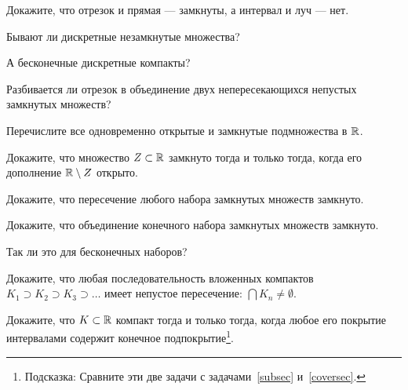 \documentclass[a4paper, 12pt, num=27]{listok}
\begin{document}
\begin{problem}
	Докажите, что отрезок и прямая --- замкнуты, а интервал и луч --- нет.
\end{problem}
\begin{problem}
\begin{probparts}
	\item Бывают ли дискретные незамкнутые множества?
	\item А бесконечные дискретные компакты?
\end{probparts}
\end{problem}
\begin{problem}
\begin{probparts}
	\item Разбивается ли отрезок в объединение двух непересекающихся непустых замкнутых множеств?
	\item Перечислите все одновременно открытые и замкнутые подмножества в $\mathbb{R}$.
\end{probparts}
\end{problem}
\begin{problem}
	Докажите, что множество $Z \subset \mathbb{R}$ замкнуто тогда и только тогда, когда его дополнение $\mathbb{R} \setminus Z$ открыто.
\end{problem}
\begin{problem}
	Докажите, что пересечение любого набора замкнутых множеств замкнуто.
\end{problem}
\begin{problem}
\begin{probparts}
	\item Докажите, что объединение конечного набора замкнутых множеств замкнуто.
	\item Так ли это для бесконечных наборов?
\end{probparts}
\end{problem}
\begin{problem}
	Докажите, что любая последовательность вложенных компактов $K_1 \supset K_2 \supset K_3 \supset \ldots$
	имеет непустое пересечение: $\bigcap K_n \ne \emptyset$.
\end{problem}
\begin{problem}
	Докажите, что $K \subset \mathbb{R}$ компакт тогда и только тогда, когда любое его покрытие интервалами содержит конечное подпокрытие\footnote{%
		Подсказка: Сравните эти две задачи с задачами~\ref{subsec} и~\ref{coversec}.
	}.
\end{problem}
\end{document}
